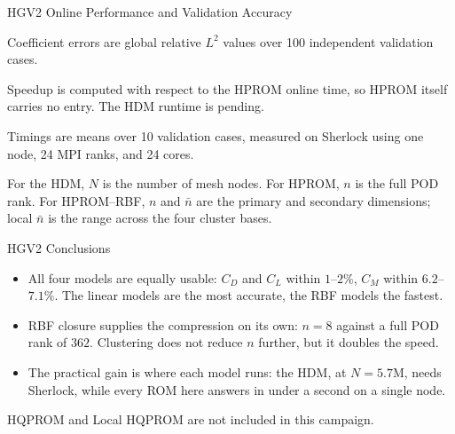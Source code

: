 \documentclass[aspectratio=169]{beamer}
\begin{document}
\begin{frame}{HGV2 Online Performance and Validation Accuracy}
\scriptsize
\centering
{}
\vspace{0.2em}

{\tiny Coefficient errors are global relative $L^2$ values over 100 independent validation cases.}

{\tiny Speedup is computed with respect to the HPROM online time, so HPROM itself carries no entry. The HDM runtime is pending.}

{\tiny Timings are means over 10 validation cases, measured on Sherlock using one node, 24 MPI ranks, and 24 cores.}

{\tiny For the HDM, $N$ is the number of mesh nodes. For HPROM, $n$ is the full POD rank. For HPROM--RBF, $n$ and $\bar{n}$ are the primary and secondary dimensions; local $\bar{n}$ is the range across the four cluster bases.}
\end{frame}

\begin{frame}{HGV2 Conclusions}
\small
\begin{itemize}
  \item All four models are equally usable: $C_D$ and $C_L$ within $1$--$2\%$, $C_M$
        within $6.2$--$7.1\%$. The linear models are the most accurate, the RBF models
        the fastest.
  \item RBF closure supplies the compression on its own: $n=8$ against a full POD rank
        of $362$. Clustering does not reduce $n$ further, but it doubles the speed.
  \item The practical gain is where each model runs: the HDM, at $N=5.7$M, needs
        Sherlock, while every ROM here answers in under a second on a single node.
\end{itemize}

\vspace{0.3em}
{\footnotesize HQPROM and Local HQPROM are not included in this campaign.}
\end{frame}
\end{document}

